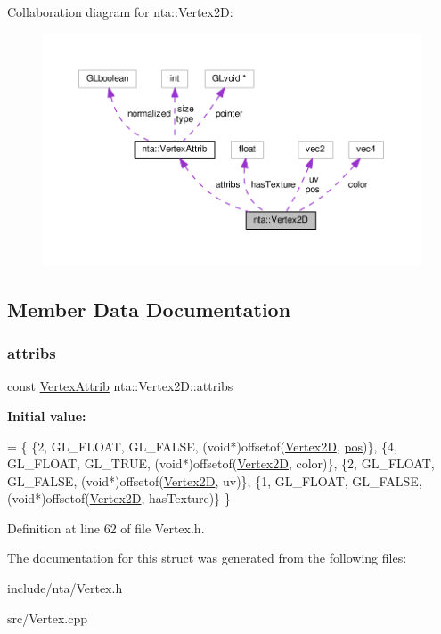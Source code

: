 Collaboration diagram for nta\+:\+:Vertex2D\+:
\nopagebreak
\begin{figure}[H]
\begin{center}
\leavevmode
\includegraphics[width=350pt]{df/deb/structnta_1_1Vertex2D__coll__graph}
\end{center}
\end{figure}


\subsection{Member Data Documentation}
\mbox{\label{structnta_1_1Vertex2D_a6be835338c31e6ce40e1a2f5a3039560}} 
\subsubsection{\texorpdfstring{attribs}{attribs}}
{\footnotesize\ttfamily const \hyperlink{namespacenta_df/d9d/structnta_1_1VertexAttrib}{Vertex\+Attrib} nta\+::\+Vertex2\+D\+::attribs\hspace{0.3cm}{\ttfamily [static]}}

{\bfseries Initial value\+:}
\begin{DoxyCode}
= \{
        \{2, GL\_FLOAT, GL\_FALSE, (\textcolor{keywordtype}{void}*)offsetof(\hyperlink{structnta_1_1Vertex2D_a696744d55f56ae170684266eab073c0f}{Vertex2D}, \hyperlink{structnta_1_1Vertex2D_a27a44e1ca52b5a5a13d37495e9376636}{pos})\},
        \{4, GL\_FLOAT, GL\_TRUE,  (\textcolor{keywordtype}{void}*)offsetof(\hyperlink{structnta_1_1Vertex2D_a696744d55f56ae170684266eab073c0f}{Vertex2D}, color)\},
        \{2, GL\_FLOAT, GL\_FALSE, (\textcolor{keywordtype}{void}*)offsetof(\hyperlink{structnta_1_1Vertex2D_a696744d55f56ae170684266eab073c0f}{Vertex2D}, uv)\},
        \{1, GL\_FLOAT, GL\_FALSE, (\textcolor{keywordtype}{void}*)offsetof(\hyperlink{structnta_1_1Vertex2D_a696744d55f56ae170684266eab073c0f}{Vertex2D}, hasTexture)\}
    \}
\end{DoxyCode}


Definition at line 62 of file Vertex.\+h.



The documentation for this struct was generated from the following files\+:\begin{DoxyCompactItemize}
\item 
include/nta/Vertex.\+h\item 
src/Vertex.\+cpp\end{DoxyCompactItemize}
